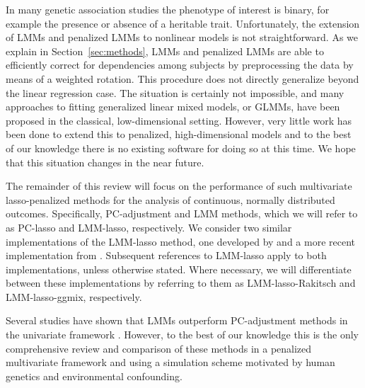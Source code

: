 In many genetic association studies the phenotype of interest is binary, for example the presence or absence of a heritable trait. Unfortunately, the extension of LMMs and penalized LMMs to nonlinear models is not straightforward. As we explain in Section~\ref{sec:methods}, LMMs and penalized LMMs are able to efficiently correct for dependencies among subjects by preprocessing the data by means of a weighted rotation. This procedure does not directly generalize beyond the linear regression case. The situation is certainly not impossible, and many approaches to fitting generalized linear mixed models, or GLMMs, have been proposed in the classical, low-dimensional setting. However, very little work has been done to extend this to penalized, high-dimensional models and to the best of our knowledge there is no existing software for doing so at this time. We hope that this situation changes in the near future.


The remainder of this review will focus on the performance of such multivariate lasso-penalized methods for the analysis of continuous, normally distributed outcomes. Specifically, PC-adjustment and LMM methods, which we will refer to as PC-lasso and LMM-lasso, respectively. We consider two similar implementations of the LMM-lasso method, one developed by \citet{rakitsch2013lasso} and a more recent implementation from \citet{bhatnagar2020simultaneous}. Subsequent references to LMM-lasso apply to both implementations, unless otherwise stated. Where necessary, we will differentiate between these implementations by referring to them as LMM-lasso-Rakitsch and LMM-lasso-ggmix, respectively. 

Several studies have shown that LMMs outperform PC-adjustment methods in the univariate framework \citep{wang2013analytical, kang2010variance, zhao2007arabidopsis}. However, to the best of our knowledge this is the only comprehensive review and comparison of these methods in a penalized multivariate framework and using a simulation scheme motivated by human genetics and environmental confounding.\\

